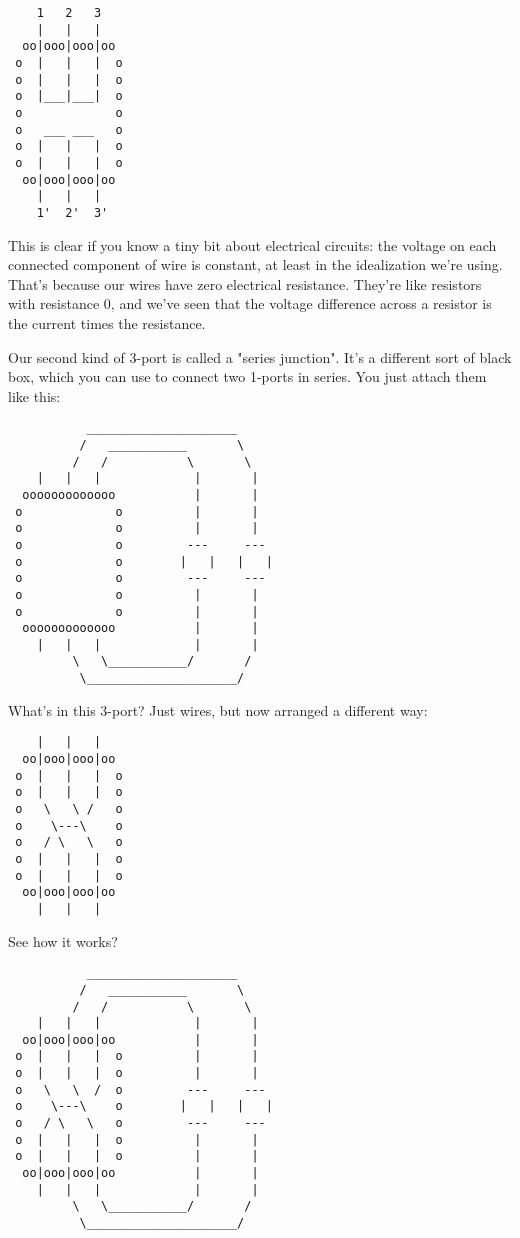 \begin{verbatim}
    1   2   3
    |   |   |
  oo|ooo|ooo|oo
 o  |   |   |  o
 o  |   |   |  o
 o  |___|___|  o
 o             o
 o   ___ ___   o
 o  |   |   |  o
 o  |   |   |  o
  oo|ooo|ooo|oo
    |   |   |
    1'  2'  3'

\end{verbatim}
    
This is clear if you know a tiny bit about electrical circuits:
the voltage on each connected component of wire is constant, at
least in the idealization we're using.  That's because our wires
have zero electrical resistance.  They're like resistors with 
resistance 0, and we've seen that the voltage difference across
a resistor is the current times the resistance.  

Our second kind of 3-port is called a "series junction".  It's a
different sort of black box, which you can use to connect two 1-ports
in series.  You just attach them like this:

\begin{verbatim}
           _____________________
          /   ___________       \
         /   /           \       \
    |   |   |             |       |
  ooooooooooooo           |       |
 o             o          |       |
 o             o          |       |
 o             o         ---     ---
 o             o        |   |   |   |
 o             o         ---     ---
 o             o          |       |
 o             o          |       |
  ooooooooooooo           |       |
    |   |   |             |       |
         \   \___________/       /  
          \_____________________/    
\end{verbatim}
    

What's in this 3-port?  Just wires, but now arranged a different way:


\begin{verbatim}
    |   |   |
  oo|ooo|ooo|oo
 o  |   |   |  o
 o  |   |   |  o
 o   \   \ /   o
 o    \---\    o
 o   / \   \   o
 o  |   |   |  o
 o  |   |   |  o
  oo|ooo|ooo|oo
    |   |   |
\end{verbatim}
    

See how it works?

\begin{verbatim}
           _____________________
          /   ___________       \
         /   /           \       \
    |   |   |             |       |
  oo|ooo|ooo|oo           |       |
 o  |   |   |  o          |       |
 o  |   |   |  o          |       |
 o   \   \  /  o         ---     ---
 o    \---\    o        |   |   |   |
 o   / \   \   o         ---     ---
 o  |   |   |  o          |       |
 o  |   |   |  o          |       |
  oo|ooo|ooo|oo           |       |
    |   |   |             |       |
         \   \___________/       /  
          \_____________________/    
\end{verbatim}
    

